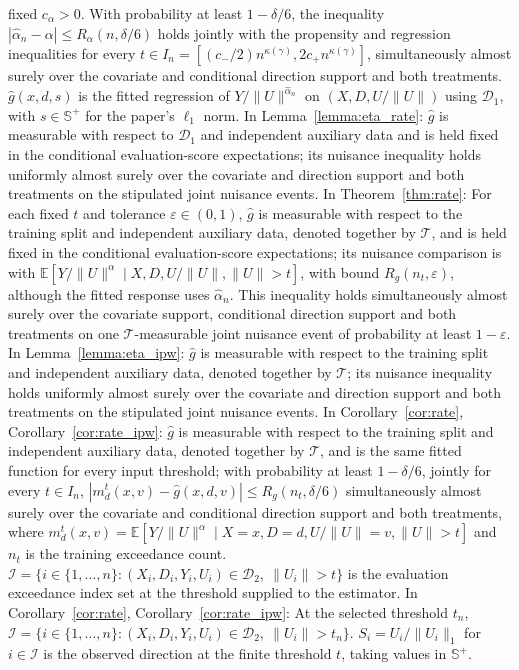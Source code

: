 \documentclass[12pt]{article}
\theoremstyle{plain}
\theoremstyle{definition}
\begin{document}
\begin{algorithm}[!tb]
\begin{algorithmic}[1]
fixed $c_\alpha>0$. With probability at least $1-\delta/6$, the inequality $|\hat\alpha_n-\alpha|\leq R_\alpha(n,\delta/6)$ holds jointly with the propensity and regression inequalities for every $t\in I_n=[(c_-/2)n^{\kappa(\gamma)},2c_+n^{\kappa(\gamma)}]$, simultaneously almost surely over the covariate and conditional direction support and both treatments. $\hat g(x,d,s)$ is the fitted regression of $Y/\|U\|^{\hat\alpha_n}$ on $(X,D,U/\|U\|)$ using $\mathcal D_1$, with $s\in\mathbb S^+$ for the paper's $\ell_1$ norm. In Lemma~\ref{lemma:eta_rate}: $\hat g$ is measurable with respect to $\mathcal D_1$ and independent auxiliary data and is held fixed in the conditional evaluation-score expectations; its nuisance inequality holds uniformly almost surely over the covariate and direction support and both treatments on the stipulated joint nuisance events. In Theorem~\ref{thm:rate}: For each fixed $t$ and tolerance $\varepsilon\in(0,1)$, $\hat g$ is measurable with respect to the training split and independent auxiliary data, denoted together by $\mathcal T$, and is held fixed in the conditional evaluation-score expectations; its nuisance comparison is with $\mathbb E[Y/\|U\|^{\alpha}\mid X,D,U/\|U\|,\|U\|>t]$, with bound $R_g(n_t,\varepsilon)$, although the fitted response uses $\hat\alpha_n$. This inequality holds simultaneously almost surely over the covariate support, conditional direction support and both treatments on one $\mathcal T$-measurable joint nuisance event of probability at least $1-\varepsilon$. In Lemma~\ref{lemma:eta_ipw}: $\hat g$ is measurable with respect to the training split and independent auxiliary data, denoted together by $\mathcal T$; its nuisance inequality holds uniformly almost surely over the covariate and direction support and both treatments on the stipulated joint nuisance events. In Corollary~\ref{cor:rate}, Corollary~\ref{cor:rate_ipw}: $\hat g$ is measurable with respect to the training split and independent auxiliary data, denoted together by $\mathcal T$, and is the same fitted function for every input threshold; with probability at least $1-\delta/6$, jointly for every $t\in I_n$, $|m_d^t(x,v)-\hat g(x,d,v)|\leq R_g(n_t,\delta/6)$ simultaneously almost surely over the covariate and conditional direction support and both treatments, where $m_d^t(x,v)=\mathbb E[Y/\|U\|^\alpha\mid X=x,D=d,U/\|U\|=v,\|U\|>t]$ and $n_t$ is the training exceedance count. $\mathcal I=\{i\in\{1,\ldots,n\}: (X_i,D_i,Y_i,U_i)\in\mathcal D_2,\ \|U_i\|>t\}$ is the evaluation exceedance index set at the threshold supplied to the estimator. In Corollary~\ref{cor:rate}, Corollary~\ref{cor:rate_ipw}: At the selected threshold $t_n$, $\mathcal I=\{i\in\{1,\ldots,n\}:(X_i,D_i,Y_i,U_i)\in\mathcal D_2,\ \|U_i\|>t_n\}$. $S_i=U_i/\|U_i\|_1$ for $i\in\mathcal{I}$ is the observed direction at the finite threshold $t$, taking values in $\mathbb{S}^+$.


\end{algorithmic}
\end{algorithm}
\end{document}

